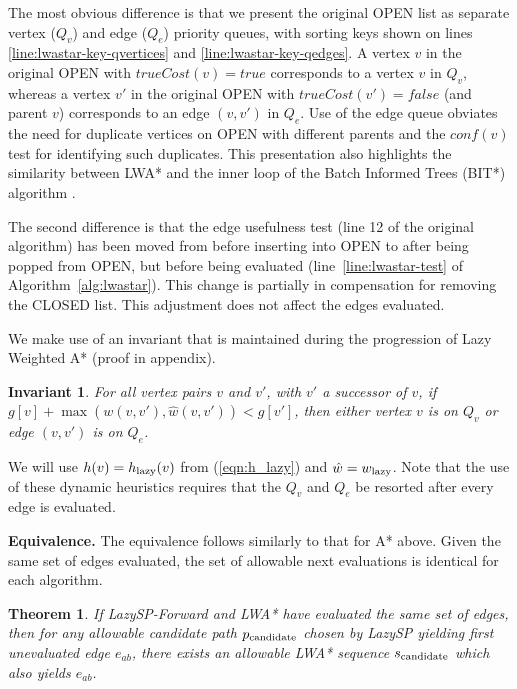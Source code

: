 \documentclass[nobib]{tufte-book}
\newcommand{\ms}[1]{\mbox{\scriptsize #1}}
\newtheorem{invariant}{Invariant}
\newtheorem{theorem}{Theorem}
\begin{document}
The most obvious difference is that we present the original OPEN list
as separate vertex ($Q_v$) and edge ($Q_e$) priority queues,
with sorting keys shown on lines \ref{line:lwastar-key-qvertices}
and \ref{line:lwastar-key-qedges}.
A vertex $v$ in the original OPEN with $trueCost(v) = true$
corresponds to a vertex $v$ in $Q_v$,
whereas a vertex $v'$ in the original OPEN
with $trueCost(v') = false$ (and parent $v$)
corresponds to an edge $(v,v')$ in $Q_e$.
Use of the edge queue obviates the need for
duplicate vertices on OPEN with different parents
and the $conf(v)$ test for identifying such duplicates.
This presentation also highlights the similarity between LWA*
and the inner loop of the Batch Informed Trees (BIT*) algorithm
\citep{gammell2015bitstar}.

The second difference is that the edge usefulness test
(line 12 of the original algorithm)
has been moved from before inserting into OPEN
to after being popped from OPEN,
but before being evaluated
(line~\ref{line:lwastar-test} of Algorithm~\ref{alg:lwastar}).
This change is partially in compensation for removing the CLOSED
list.
This adjustment
does not affect the edges evaluated.

We make use of an invariant that is maintained during the
progression of Lazy Weighted A* (proof in appendix).
\begin{invariant}
For all vertex pairs $v$ and $v'$,
with $v'$ a successor of $v$,
if $g[v] + \max(w(v,v'), \hat{w}(v,v')) < g[v']$,
then either vertex $v$ is on $Q_{v}$
or edge $(v,v')$ is on $Q_e$.%
\label{inv:lwastar}%
\end{invariant}
We will use $h(v) = h_{\ms{lazy}}(v)$ from (\ref{eqn:h_lazy})
and $\hat{w} = w_{\ms{lazy}}$.
Note that the use of these dynamic heuristics requires that the
$Q_v$ and $Q_e$ be resorted after every edge is evaluated.

\textbf{Equivalence.}
The equivalence follows similarly to that for A* above.
Given the same set of edges evaluated,
the set of allowable next evaluations is identical for each
algorithm.

\begin{theorem}
If LazySP-Forward and LWA* have evaluated the same set of edges,
then for any allowable candidate path $p_{\ms{candidate}}$
chosen by LazySP yielding first unevaluated edge $e_{ab}$,
there exists an allowable LWA* sequence $s_{\ms{candidate}}$
which also yields $e_{ab}$.
\label{thm:lwastar-equiv-from-lazy}
\end{theorem}
\end{document}

